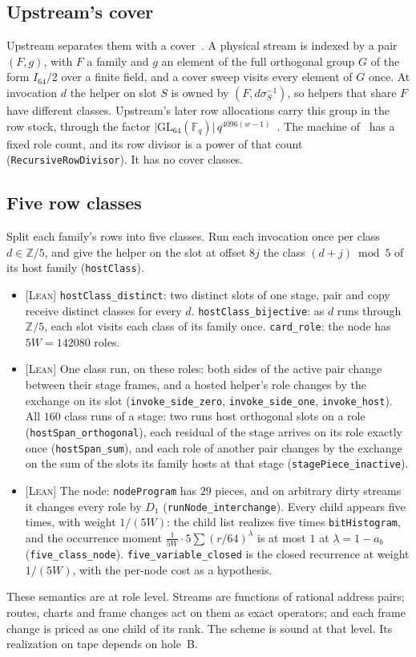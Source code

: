 \documentclass[11pt]{amsart}
\newcommand{\F}{\mathbb{F}}
\newcommand{\lean}[1]{\texttt{#1}}
\newcommand{\tagL}{\textsc{[Lean]}}
\begin{document}
\subsection{Upstream's cover}
Upstream separates them with a cover~\cite[\S\S2,4]{FH}. A physical stream is indexed by a pair
$(F, g)$, with $F$ a family and $g$ an element of the full orthogonal group $G$ of the form
$I_{64}/2$ over a finite field, and a cover sweep visits every element of $G$ once. At invocation
$d$ the helper on slot $S$ is owned by $(F, d\sigma_S^{-1})$, so helpers that share $F$ have
different classes. Upstream's later row allocations carry this group in the row stock, through the
factor $\lvert \mathrm{GL}_{64}(\F_q)\rvert\, q^{4096(w-1)}$~\cite{LRS}. The machine
of~\cite{IMB} has a fixed role count, and its row divisor is a power of that count
(\lean{RecursiveRowDivisor}). It has no cover classes.

\subsection{Five row classes}
Split each family's rows into five classes. Run each invocation once per class $d \in
\mathbb{Z}/5$, and give the helper on the slot at offset $8j$ the class $(d + j) \bmod 5$ of its
host family (\lean{hostClass}).
\begin{itemize}
\item \tagL{} \lean{hostClass\_distinct}: two distinct slots of one stage, pair and copy receive
  distinct classes for every $d$. \lean{hostClass\_bijective}: as $d$ runs through $\mathbb{Z}/5$,
  each slot visits each class of its family once. \lean{card\_role}: the node has $5W = 142080$
  roles.
\item \tagL{} One class run, on these roles: both sides of the active pair change between their
  stage frames, and a hosted helper's role changes by the exchange on its slot
  (\lean{invoke\_side\_zero}, \lean{invoke\_side\_one}, \lean{invoke\_host}). All $160$ class runs
  of a stage: two runs host orthogonal slots on a role (\lean{hostSpan\_orthogonal}), each residual
  of the stage arrives on its role exactly once (\lean{hostSpan\_sum}), and each role of another
  pair changes by the exchange on the sum of the slots its family hosts at that stage
  (\lean{stagePiece\_inactive}).
\item \tagL{} The node: \lean{nodeProgram} has $29$ pieces, and on arbitrary dirty streams it
  changes every role by $D_1$ (\lean{runNode\_interchange}). Every child appears five times, with
  weight $1/(5W)$: the child list realizes five times \lean{bitHistogram}, and the occurrence
  moment $\frac{1}{5W}\cdot 5\sum (r/64)^\lambda$ is at most $1$ at $\lambda = 1 - a_b$
  (\lean{five\_class\_node}). \lean{five\_variable\_closed} is the closed recurrence at
  weight $1/(5W)$, with the per-node cost as a hypothesis.
\end{itemize}
These semantics are at role level. Streams are functions of rational address pairs; routes,
charts and frame changes act on them as exact operators; and each frame change is priced as one
child of its rank. The scheme is sound at that level. Its realization on tape depends on hole~B.
\end{document}
